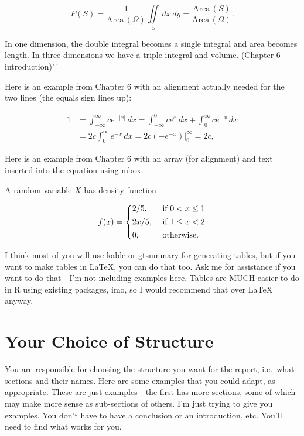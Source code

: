\documentclass[12pt]{article}
\begin{document}
\[ P(S) = \frac{1}{\mbox{Area}\,(\Omega)} \iint\limits_S \, dx \, dy = \frac{\mbox{Area}\,(S)}{\mbox{Area}\,(\Omega)}.\]

In one dimension, the double integral becomes a single integral and area
becomes length. In three dimensions we have a triple integral and
volume. (Chapter 6 introduction)'\,'

Here is an example from Chapter 6 with an alignment actually needed for
the two lines (the equals sign lines up):

\begin{align*}
1 & = \int_{-\infty}^{\infty} ce^{-|x|} \, dx   = \int_{-\infty}^0 c e^x \, dx + \int_0^{\infty} c e^{-x} \, dx \\
&= 2c \int_0^{\infty}  e^{-x} \, dx = 2c \left. (- e^{-x}) \right|_0^{\infty} = 2c,
\end{align*}

Here is an example from Chapter 6 with an array (for alignment) and text
inserted into the equation using mbox.

A random variable \(X\) has density function

\[ f(x) = \left\{ \begin{array}{@{}ll@{}}
2/5, & \mbox{ if } 0 < x \leq 1 \\[1ex]
2x/5, & \mbox{ if } 1 \leq x < 2 \\[1ex]
0, & \mbox{ otherwise.}  \end{array} \right.
\]

I think most of you will use kable or gtsummary for generating tables,
but if you want to make tables in LaTeX, you can do that too. Ask me for
assistance if you want to do that - I'm not including examples here.
Tables are MUCH easier to do in R using existing packages, imo, so I
would recommend that over LaTeX anyway.

\hypertarget{your-choice-of-structure}{%
\section{Your Choice of Structure}\label{your-choice-of-structure}}

You are responsible for choosing the structure you want for the report,
i.e.~what sections and their names. Here are some examples that you
could adapt, as appropriate. These are just examples - the first has
more sections, some of which may make more sense as sub-sections of
others. I'm just trying to give you examples. You don't have to have a
conclusion or an introduction, etc. You'll need to find what works for
you.
\end{document}
